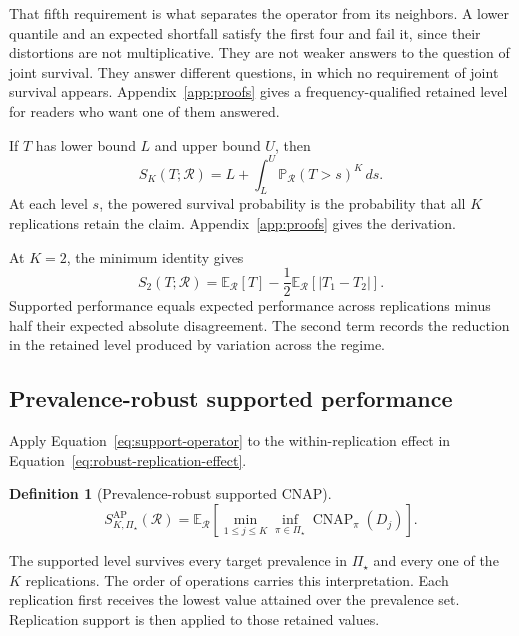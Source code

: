 \documentclass[11pt]{article}
\newcommand{\CNAP}{\operatorname{CNAP}}
\newcommand{\Regime}{\mathcal{R}}
\newcommand{\PSet}{\Pi_\star}
\newcommand{\E}{\mathbb{E}}
\newcommand{\Prb}{\mathbb{P}}
\newcommand{\SRob}{S_{K,\PSet}^{\mathrm{AP}}(\Regime)}
\newtheorem{definition}{Definition}
\theoremstyle{remark}
\begin{document}
That fifth requirement is what separates the operator from its neighbors. A lower quantile and an expected shortfall satisfy the first four and fail it, since their distortions are not multiplicative. They are not weaker answers to the question of joint survival. They answer different questions, in which no requirement of joint survival appears. Appendix~\ref{app:proofs} gives a frequency-qualified retained level for readers who want one of them answered.

If $T$ has lower bound $L$ and upper bound $U$, then
\begin{equation}
S_K(T;\Regime)
=
L+\int_L^U
\Prb_{\Regime}(T>s)^K\,ds.
\label{eq:support-survival}
\end{equation}
At each level $s$, the powered survival probability is the probability that all $K$ replications retain the claim. Appendix~\ref{app:proofs} gives the derivation.

At $K=2$, the minimum identity gives
\begin{equation}
S_2(T;\Regime)
=
\E_{\Regime}[T]
-
\frac12
\E_{\Regime}
\left[
|T_1-T_2|
\right].
\label{eq:k2-decomposition}
\end{equation}
Supported performance equals expected performance across replications minus half their expected absolute disagreement. The second term records the reduction in the retained level produced by variation across the regime.

\subsection{Prevalence-robust supported performance}

Apply Equation~\eqref{eq:support-operator} to the within-replication effect in Equation~\eqref{eq:robust-replication-effect}.

\begin{definition}[Prevalence-robust supported CNAP]
\begin{equation}
\SRob
=
\E_{\Regime}
\left[
\min_{1\leq j\leq K}
\inf_{\pi\in\PSet}
\CNAP_\pi(D_j)
\right].
\label{eq:robust-support}
\end{equation}
\end{definition}

The supported level survives every target prevalence in $\PSet$ and every one of the $K$ replications. The order of operations carries this interpretation. Each replication first receives the lowest value attained over the prevalence set. Replication support is then applied to those retained values.
\end{document}
